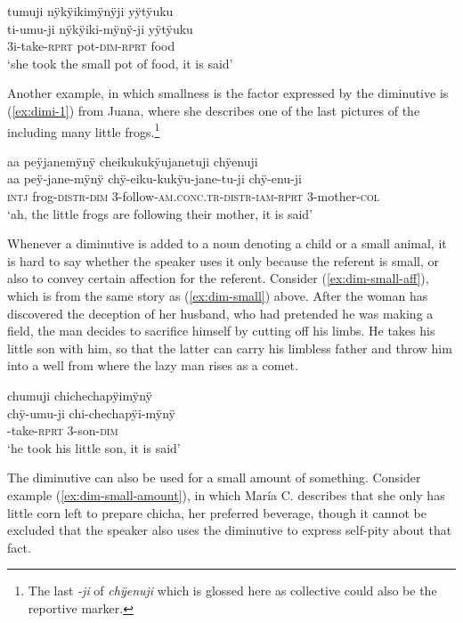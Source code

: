 \ea\label{ex:dim-small}
\begingl 
\glpreamble tumuji nÿkÿikimÿnÿji yÿtÿuku\\
\gla ti-umu-ji nÿkÿiki-mÿnÿ-ji yÿtÿuku\\ 
\glb 3i-take-\textsc{rprt} pot-\textsc{dim}-\textsc{rprt} food\\ 
\glft ‘she took the small pot of food, it is said’\\ 
\endgl
\trailingcitation{[mox-n110920l.058-059]}
\xe

Another example, in which smallness is the factor expressed by the diminutive is (\ref{ex:dimi-1}) from Juana, where she describes one of the last pictures of the  including many little frogs.\footnote{The last \textit{-ji} of \textit{chÿenuji} which is glossed here as collective could also be the reportive marker.}

\ea\label{ex:dimi-1}
\begingl
\glpreamble aa peÿjanemÿnÿ cheikukukÿujanetuji chÿenuji\\
\gla aa peÿ-jane-mÿnÿ chÿ-eiku-kukÿu-jane-tu-ji chÿ-enu-ji\\
\glb \textsc{intj} frog-\textsc{distr}-\textsc{dim} 3-follow-\textsc{am.conc.tr}-\textsc{distr}-\textsc{iam}-\textsc{rprt} 3-mother-\textsc{col} \\
\glft ‘ah, the little frogs are following their mother, it is said’
\endgl
\trailingcitation{[jxx-a120516l-a.440]}
\xe

Whenever a diminutive is added to a noun denoting a child or a small animal, it is hard to say whether the speaker uses it only because the referent is small, or also to convey certain affection for the referent.  Consider (\ref{ex:dim-small-aff}), which is from the same story as (\ref{ex:dim-small}) above. After the woman has discovered the deception of her husband, who had pretended he was making a field, the man decides to sacrifice himself by cutting off his limbs. He takes his little son with him, so that the latter can carry his limbless father and throw him into a well from where the lazy man rises as a comet.

\ea\label{ex:dim-small-aff}
\begingl 
\glpreamble chumuji chichechapÿimÿnÿ\\
\gla chÿ-umu-ji chi-chechapÿi-mÿnÿ\\ 
-take-\textsc{rprt} 3-son-\textsc{dim}\\ 
\glft ‘he took his little son, it is said’\\ 
\endgl
\trailingcitation{[mox-n110920l.089]}
\xe

The diminutive can also be used for a small amount of something. Consider example (\ref{ex:dim-small-amount}), in which María C. describes that she only has little corn left to prepare chicha, her preferred beverage, though it cannot be excluded that the speaker also uses the diminutive to express self-pity about that fact.

